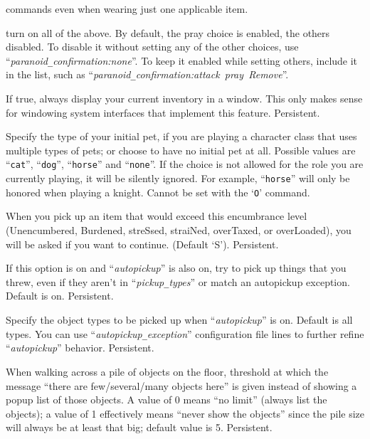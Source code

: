 commands even when wearing just one applicable item.
\item[{\tt all~~~~}]
turn on all of the above.
\elist
By default, the pray choice is enabled, the others disabled.
To disable it without setting
any of the other choices, use ``{\it paranoid\verb+_+confirmation:none}''.  To keep
it enabled while setting others, include it in the list,
such as ``{\it par\-a\-noid\verb+_+con\-fir\-ma\-tion:attack~pray~Remove}''.
\item[\ib{perm\verb+_+invent}]
If true, always display your current inventory in a window.  This only
makes sense for windowing system interfaces that implement this feature.
Persistent.
\item[\ib{pettype}]
Specify the type of your initial pet, if you are playing a character class
that uses multiple types of pets; or choose to have no initial pet at all.
Possible values are ``{\tt cat}'', ``{\tt dog}'', ``{\tt horse}''
and ``{\tt none}''.
If the choice is not allowed for the role you are currently playing,
it will be silently ignored.  For example, ``{\tt horse}'' will only be
honored when playing a knight.
Cannot be set with the `{\tt O}' command.
\item[\ib{pickup\verb+_+burden}]
When you pick up an item that would exceed this encumbrance
level (Unencumbered, Burdened, streSsed, straiNed, overTaxed,
or overLoaded), you will be asked if you want to continue.
(Default `S').  Persistent.
\item[\ib{pickup\verb+_+thrown}]
If this option is on and ``{\it autopickup\/}'' is also on, try to pick up
things that you threw, even if they aren't in ``{\it pickup\verb+_+types\/}'' or
match an autopickup exception.  Default is on.  Persistent.
\item[\ib{pickup\verb+_+types}]
Specify the object types to be picked up when ``{\it autopickup\/}'' 
is on.  Default is all types.  You can use ``{\it autopickup\verb+_+exception\/}''
configuration file lines to further refine ``{\it autopickup\/}'' behavior.
Persistent.
\item[\ib{pile\verb+_+limit}]
When walking across a pile of objects on the floor, threshold at which
the message ``there are few/several/many objects here'' is given instead
of showing a popup list of those objects.  A value of 0 means ``no limit''
(always list the objects); a value of 1 effectively means ``never show
the objects'' since the pile size will always be at least that big;
default value is 5.  Persistent.
\item[\ib{playmode}]
